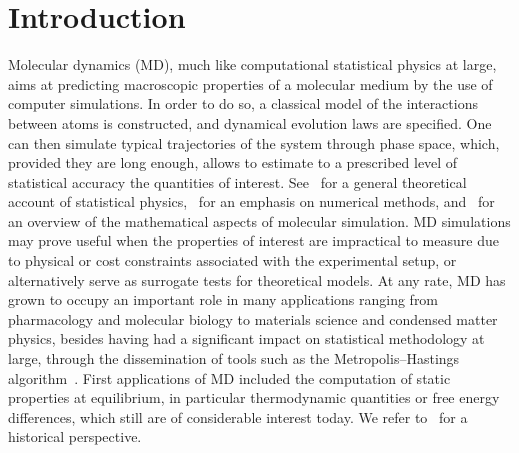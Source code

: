 \section{Introduction}\label{04:intro}
Molecular dynamics (MD), much like computational statistical physics at large, aims at predicting macroscopic properties of a molecular medium by the use of computer simulations. In order to do so, a classical model of the interactions between atoms is constructed, and dynamical evolution laws are specified.
One can then simulate typical trajectories of the system through phase space, which,  provided they are long enough, allows to estimate to a prescribed level of statistical accuracy the quantities of interest. See~\cite{B91} for a general theoretical account of statistical physics,~\cite{T10,AT17,FS01} for an emphasis on numerical methods, and~\cite{LM15,LS16} for an overview of the mathematical aspects of molecular simulation.
MD simulations may prove useful when the properties of interest are impractical to measure due to physical or cost constraints associated with the experimental setup, or alternatively serve as surrogate tests for theoretical models. At any rate, MD has grown to occupy an important role in many applications ranging from pharmacology and molecular biology to materials science and condensed matter physics, besides having had a significant impact on statistical methodology at large, through the dissemination of tools such as the Metropolis--Hastings algorithm~\cite{MRTT53}.
First applications of MD included the computation of static properties at equilibrium, in particular thermodynamic quantities or free energy differences, which still are of considerable interest today. We refer to~\cite{CKS05} for a historical perspective.

